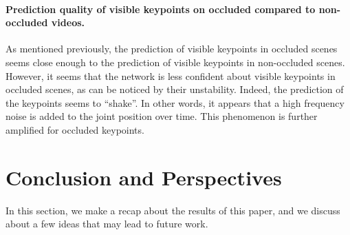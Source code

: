 \documentclass[runningheads]{llncs}
\begin{document}
\paragraph{Prediction quality of visible keypoints on occluded compared to non-occluded videos.}
As mentioned previously, the prediction of visible keypoints in occluded scenes seems close enough to the prediction of visible keypoints in non-occluded scenes. However, it seems that the network is less confident about visible keypoints in occluded scenes, as can be noticed by their unstability. Indeed, the prediction of the keypoints seems to ``shake''. In other words, it appears that a high frequency noise is added to the joint position over time. This phenomenon is further amplified for occluded keypoints. \\

\section{Conclusion and Perspectives}
In this section, we make a recap about the results of this paper, and we discuss about a few ideas that may lead to future work.
\end{document}

